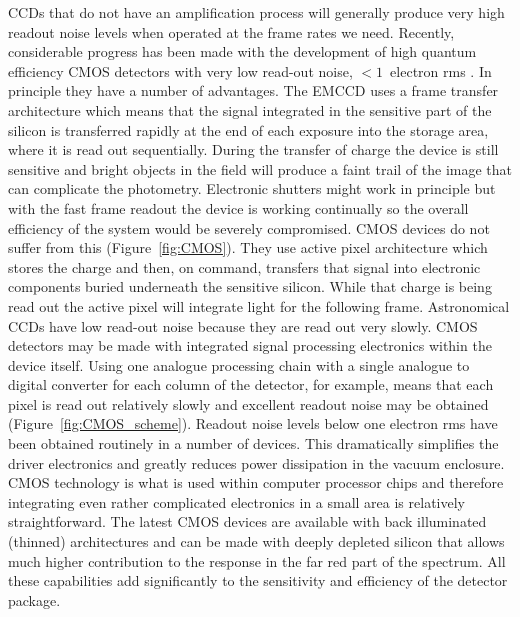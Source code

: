 \documentclass{pasa}%
\begin{document}
CCDs that do not have an amplification process will generally produce very high readout noise levels when operated at the frame rates we need.  Recently, considerable progress has been made with the development of high quantum efficiency CMOS detectors with very low read-out noise, $<1$~electron rms \citep{Segovia2017}. In principle they have a number of advantages.  The EMCCD uses a frame transfer architecture which means that the signal integrated in the sensitive part of the silicon is transferred rapidly at the end of each exposure into the storage area, where it is read out sequentially.  During the transfer of charge the device is still sensitive and bright objects in the field will produce a faint trail of the image that can complicate the photometry. Electronic
shutters might work in principle but with the fast frame readout the
device is working continually so the overall efficiency of the system
would be severely compromised. CMOS devices do not suffer from this (Figure~\ref{fig:CMOS}).  They use active pixel architecture which stores the charge and then, on command, transfers that signal into electronic components buried underneath the sensitive silicon.  While that charge is being read out the active pixel will integrate light for the following frame.  Astronomical CCDs have low read-out noise because they are read out very slowly.  CMOS detectors may be made with integrated signal processing electronics within the device itself.  Using one analogue processing chain with a single analogue to digital converter for each column of the detector, for example, means that each pixel is read out relatively slowly and excellent readout noise may be obtained (Figure~\ref{fig:CMOS_scheme}).  Readout noise levels below one electron rms have been obtained routinely in a number of devices.  This dramatically simplifies the driver electronics and greatly reduces power dissipation in the
vacuum enclosure.  CMOS technology is what is used within computer processor chips and therefore integrating even rather complicated electronics in a small area is relatively straightforward.  The latest CMOS devices are available with back illuminated (thinned) architectures and can be made with deeply depleted silicon that allows much higher contribution to the response in the far red part of the spectrum.  All these capabilities add significantly to the sensitivity and efficiency of the detector package.
\end{document}
